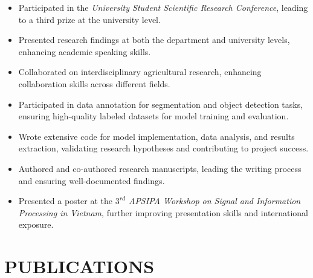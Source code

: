 \documentclass[a4paper,9pt]{extarticle}
\begin{document}
\begin{itemize}
    \item Participated in the \textit{University Student Scientific Research Conference}, leading to a third prize at the university level.
    \item Presented research findings at both the department and university levels, enhancing academic speaking skills.
    \item Collaborated on interdisciplinary agricultural research, enhancing collaboration skills across different fields.
    \item Participated in data annotation for segmentation and object detection tasks, ensuring high-quality labeled datasets for model training and evaluation.
    \item Wrote extensive code for model implementation, data analysis, and results extraction, validating research hypotheses and contributing to project success.
    \item Authored and co-authored research manuscripts, leading the writing process and ensuring well-documented findings.
    \item Presented a poster at the \textit{\(3^{rd}\) APSIPA Workshop on Signal and Information Processing in Vietnam}, further improving presentation skills and international exposure.
\end{itemize}



\section*{PUBLICATIONS}
\end{document}
